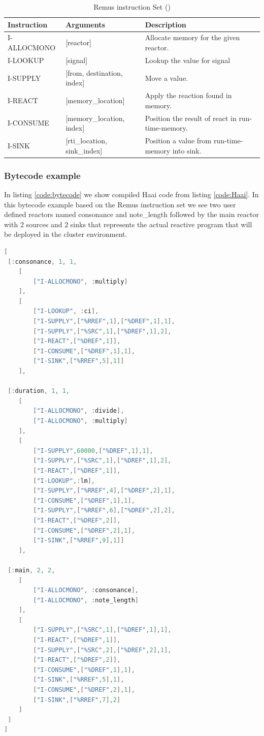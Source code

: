 \documentclass[a4paper]{book}
\begin{document}
\begin{table}[h!]
	\centering
	\begin{tabular}{@{}lll@{}}
		\toprule
		\textbf{Instruction} & \textbf{Arguments} & \textbf{Description} \\ \midrule
		I-ALLOCMONO & [reactor]  & Allocate memory for the given reactor. \\
		I-LOOKUP & [signal]  & Lookup the value for signal \\
		I-SUPPLY & [from, destination, index] &  Move a value.\\
		I-REACT  &[memory\_location] & Apply the reaction found in memory. \\
		I-CONSUME & [memory\_location, index] & Position the result of react in run-time-memory. \\
		I-SINK & [rti\_location, sink\_index]& Position a value from run-time-memory into sink. \\ 
		\toprule
	\end{tabular}
	\caption{Remus instruction Set (\cite{oeyen_remus_2022})}
	\label{tab:instructionset}
\end{table}

\newpage

\subsubsection*{Bytecode example}

In listing \ref{code:bytecode} we show compiled Haai code from listing \ref{code:Haai}. In this bytecode example based on the Remus instruction set we see two user defined reactors named consonance and note\_length followed by the main reactor with 2 sources and 2 sinks that represents the actual reactive program that will be deployed in the cluster environment.

\begin{lstlisting}[language=C, caption={Remus bytecode as Elixir nested lists},captionpos=b, label={code:bytecode}, basicstyle=\ttfamily\footnotesize, frame=single]
[
 [:consonance, 1, 1,
	[
		["I-ALLOCMONO", :multiply]
	],
	[
		["I-LOOKUP", :ci],
		["I-SUPPLY",["%RREF",1],["%DREF",1],1],
		["I-SUPPLY",["%SRC",1],["%DREF",1],2],
		["I-REACT",["%DREF",1]],
		["I-CONSUME",["%DREF",1],1],
		["I-SINK",["%RREF",5],1]]
	],

 [:duration, 1, 1,
	[
		["I-ALLOCMONO", :divide],
		["I-ALLOCMONO", :multiply]
	],
	[
		["I-SUPPLY",60000,["%DREF",1],1],
		["I-SUPPLY",["%SRC",1],["%DREF",1],2],
		["I-REACT",["%DREF",1]],
		["I-LOOKUP",:lm],
		["I-SUPPLY",["%RREF",4],["%DREF",2],1],
		["I-CONSUME",["%DREF",1],1],
		["I-SUPPLY",["%RREF",6],["%DREF",2],2],
		["I-REACT",["%DREF",2]],
		["I-CONSUME",["%DREF",2],1],
		["I-SINK",["%RREF",9],1]]
	],

 [:main, 2, 2,
	[
		["I-ALLOCMONO", :consonance],
		["I-ALLOCMONO", :note_length]
	],
	[
		["I-SUPPLY",["%SRC",1],["%DREF",1],1],
		["I-REACT",["%DREF",1]],
		["I-SUPPLY",["%SRC",2],["%DREF",2],1],
		["I-REACT",["%DREF",2]],
		["I-CONSUME",["%DREF",1],1],
		["I-SINK",["%RREF",5],1],
		["I-CONSUME",["%DREF",2],1],
		["I-SINK",["%RREF",7],2]
	]
 ]
]
\end{lstlisting}
\end{document}
